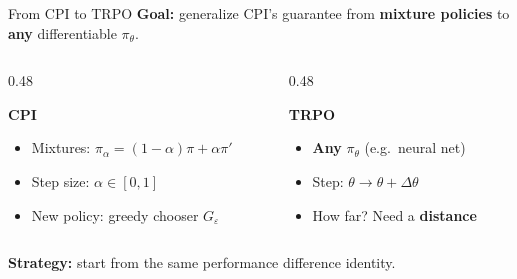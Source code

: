 \documentclass[aspectratio=169]{beamer}
\begin{document}
\begin{frame}[label=cpi-to-trpo]{From CPI to TRPO}
  \textbf{Goal:} generalize CPI's guarantee from \textbf{mixture policies} to \textbf{any} differentiable $\pi_\theta$.

  \vspace{12pt}
  \begin{columns}[c]
    \begin{column}{0.48\textwidth}
      \begin{warmbox}
        \textbf{\color{AtlasWarm}CPI}
        \begin{itemize}
          \item Mixtures: $\pi_\alpha = (1-\alpha)\pi + \alpha\pi'$
          \item Step size: $\alpha \in [0,1]$
          \item New policy: greedy chooser $G_\varepsilon$
        \end{itemize}
      \end{warmbox}
    \end{column}
    \begin{column}{0.48\textwidth}
      \begin{coolbox}
        \textbf{\color{AtlasCool}TRPO}
        \begin{itemize}
          \item \textbf{Any} $\pi_\theta$ (e.g.\ neural net)
          \item Step: $\theta \to \theta + \Delta\theta$
          \item How far? Need a \textbf{distance}
        \end{itemize}
      \end{coolbox}
    \end{column}
  \end{columns}

  \vspace{20pt}
  \textbf{Strategy:} start from the same performance difference identity.

\end{frame}
\end{document}
